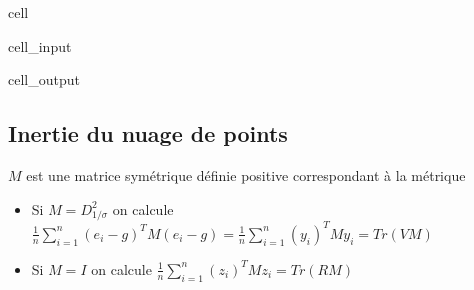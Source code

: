 \documentclass[letterpaper,10pt,english]{jupyterBook}
\begin{document}
\begin{sphinxuseclass}{cell}\begin{sphinxVerbatimInput}

\begin{sphinxuseclass}{cell_input}
\begin{sphinxVerbatim}[commandchars=\\\{\}]
    \PYG{p}{[}    \PYG{p}{]}
  \PYG{p}{[}    \PYG{p}{]}
    
    
     
\end{sphinxVerbatim}

\end{sphinxuseclass}\end{sphinxVerbatimInput}
\begin{sphinxVerbatimOutput}

\begin{sphinxuseclass}{cell_output}
\noindent{}

\end{sphinxuseclass}\end{sphinxVerbatimOutput}

\end{sphinxuseclass}

\subsection{Inertie du nuage de points}
\label{\detokenize{acp:inertie-du-nuage-de-points}}
\sphinxAtStartPar
\(M\) est une matrice symétrique définie positive correspondant à la métrique
\begin{itemize}
\item {} 
\sphinxAtStartPar
Si \(M=D^2_{1/\sigma}\) on calcule \( \frac{1}{n}\displaystyle\sum_{i=1}^n (e_i - g)^T M (e_i-g) = \frac{1}{n}\displaystyle\sum_{i=1}^n (y_i)^T M y_i = Tr(VM)\)

\item {} 
\sphinxAtStartPar
Si \(M=I\) on calcule \( \frac{1}{n}\displaystyle\sum_{i=1}^n (z_i)^T M z_i = Tr(RM)\)

\end{itemize}
\end{document}

